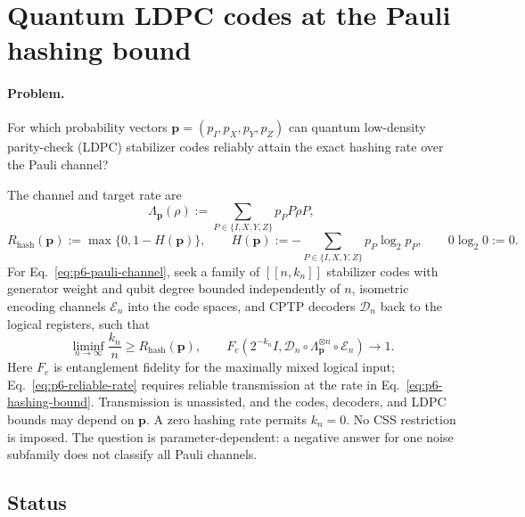 \section{Quantum LDPC codes at the Pauli hashing bound}
\label{sec:op_4830398d0c2feb5f}

\paragraph{Problem.}
For which probability vectors $\mathbf p=(p_I,p_X,p_Y,p_Z)$ can quantum
low-density parity-check (LDPC) stabilizer codes reliably attain the exact
hashing rate over the Pauli channel?

The channel and target rate are
\begin{equation}
  \Lambda_{\mathbf p}(\rho)
  :=\sum_{P\in\{I,X,Y,Z\}}p_P P\rho P,
  \label{eq:p6-pauli-channel}
\end{equation}
\begin{equation}
  R_{\mathrm{hash}}(\mathbf p):=\max\{0,1-H(\mathbf p)\},
  \qquad H(\mathbf p):=-\sum_{P\in\{I,X,Y,Z\}}p_P\log_2p_P,
  \qquad 0\log_2 0:=0.
  \label{eq:p6-hashing-bound}
\end{equation}
For Eq.~\eqref{eq:p6-pauli-channel}, seek a family of $[[n,k_n]]$ stabilizer
codes with generator weight and qubit degree bounded independently of $n$,
isometric encoding channels $\mathcal E_n$ into the code spaces, and CPTP
decoders $\mathcal D_n$ back to the logical registers, such that
\begin{equation}
  \liminf_{n\to\infty}\frac{k_n}{n}\ge R_{\mathrm{hash}}(\mathbf p),
  \qquad
  F_e\!\left(2^{-k_n}I,
    \mathcal D_n\circ\Lambda_{\mathbf p}^{\otimes n}\circ\mathcal E_n
  \right)\longrightarrow1.
  \label{eq:p6-reliable-rate}
\end{equation}
Here $F_e$ is entanglement fidelity for the maximally mixed logical input;
Eq.~\eqref{eq:p6-reliable-rate} requires reliable transmission at the rate
in Eq.~\eqref{eq:p6-hashing-bound}.  Transmission is unassisted, and the
codes, decoders, and LDPC bounds may depend on $\mathbf p$.  A zero hashing
rate permits $k_n=0$.
No CSS restriction is imposed. The question is parameter-dependent: a
negative answer for one noise subfamily does not classify all Pauli channels.

\subsection*{Status}

